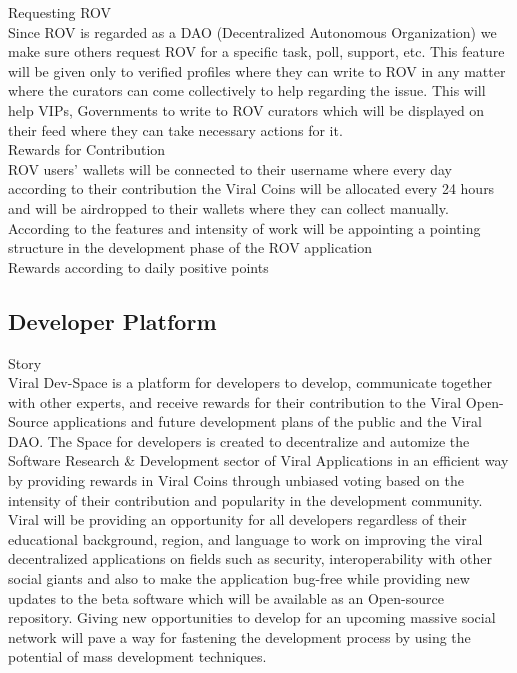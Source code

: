 \documentclass[10pt]{article}
\begin{document}
Requesting ROV\\

Since ROV is regarded as a DAO (Decentralized Autonomous Organization) we make sure others request ROV for a specific task, poll, support, etc. This feature will be given only to verified profiles where they can write to ROV in any matter where the curators can come collectively to help regarding the issue. This will help VIPs, Governments to write to ROV curators which will be displayed on their feed where they can take necessary actions for it. \\

Rewards for Contribution\\

ROV users’ wallets will be connected to their username where every day according to their contribution the Viral Coins will be allocated every 24 hours and will be airdropped to their wallets where they can collect manually. According to the features and intensity of work will be appointing a pointing structure in the development phase of the ROV application\\

Rewards according to daily positive points\\

\subsection{Developer Platform}

Story\\

Viral Dev-Space is a platform for developers to develop, communicate together with other experts, and receive rewards for their contribution to the Viral Open-Source applications and future development plans of the public and the Viral DAO. The Space for developers is created to decentralize and automize the Software Research \& Development sector of Viral Applications in an efficient way by providing rewards in Viral Coins through unbiased voting based on the intensity of their contribution and popularity in the development community.\\

Viral will be providing an opportunity for all developers regardless of their educational background, region, and language to work on improving the viral decentralized applications on fields such as security, interoperability with other social giants and also to make the application bug-free while providing new updates to the beta software which will be available as an Open-source repository. Giving new opportunities to develop for an upcoming massive social network will pave a way for fastening the development process by using the potential of mass development techniques.\\
\end{document}
